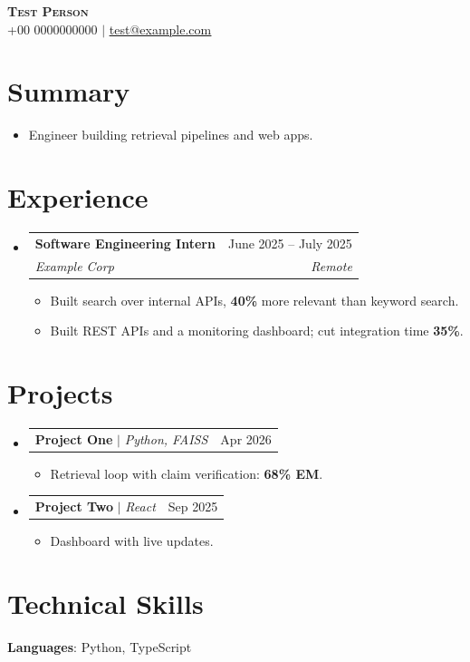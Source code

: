 \documentclass[letterpaper,11pt]{article}
\makeatletter
\newcommand{\resumeItem}[1]{
    \item\small{
        {#1 \vspace{-2pt}}
    }
}
\newcommand{\resumeSubheading}[4]{
    \vspace{-2pt}\item
    \begin{tabular*}{0.97\textwidth}[t]{l@{\extracolsep{\fill}}r}
        \textbf{#1} & #2 \\
        \textit{\small#3} & \textit{\small #4} \\
    \end{tabular*}\vspace{-7pt}
}
\newcommand{\resumeProjectHeading}[2]{
    \item
    \begin{tabular*}{0.97\textwidth}[t]{p{0.87\textwidth}@{\extracolsep{\fill}}r}
        \small #1 & \small #2 \\
    \end{tabular*}\vspace{-7pt}
}
\newcommand{\resumeSubHeadingListStart}{
    \begin{itemize}[leftmargin=0.15in, label={}]
}
\newcommand{\resumeSubHeadingListEnd}{
    \end{itemize}
}
\newcommand{\resumeItemListStart}{
    \begin{itemize}[itemsep=-1pt, topsep=2pt]
}
\newcommand{\resumeItemListEnd}{
    \end{itemize}\vspace{-5pt}
}
\makeatother
\begin{document}
\begin{center}
    \textbf{\Huge \scshape Test Person}\\ \vspace{1pt}
    \small +00 0000000000 $|$ \href{mailto:test@example.com}{\underline{test@example.com}}
\end{center}
\section{Summary}
\begin{itemize}[leftmargin=0.15in, label={}]
    \item \small Engineer building retrieval pipelines and web apps.
\end{itemize}
\section{Experience}
\resumeSubHeadingListStart
\resumeSubheading{Software Engineering Intern}{June 2025 -- July 2025}{Example Corp}{Remote}
\resumeItemListStart
    \resumeItem{Built search over internal APIs, \textbf{40\%} more relevant than keyword search.}
    \resumeItem{Built REST APIs and a monitoring dashboard; cut integration time \textbf{35\%}.}
\resumeItemListEnd
\resumeSubHeadingListEnd
\section{Projects}
\resumeSubHeadingListStart
\resumeProjectHeading{\textbf{Project One} $|$ \emph{Python, FAISS}}{Apr 2026}
\resumeItemListStart
    \resumeItem{Retrieval loop with claim verification: \textbf{68\% EM}.}
\resumeItemListEnd
\resumeProjectHeading{\textbf{Project Two} $|$ \emph{React}}{Sep 2025}
\resumeItemListStart
    \resumeItem{Dashboard with live updates.}
\resumeItemListEnd
\resumeSubHeadingListEnd
\section{Technical Skills}
\begin{itemize}[leftmargin=0.15in, label={}]
\small{\item{\textbf{Languages}{: Python, TypeScript}}}
\end{itemize}
\end{document}
